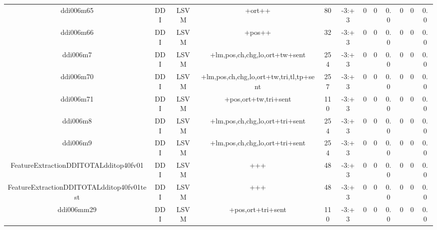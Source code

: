\documentclass[a4paper]{article}
\begin{document}
\begin{landscape}
\begin{center}
\begin{tabular}{ |c|c|c|c|c|c|c|c|c|c|c|c|}
 
 	
 	\small{ ddi006m65 } & \small{ DDI} & \small{  LSVM }  & +ort++  &  80 &  \small{  -3:+3 }  &  0 & 0 & 0.0  &  0 & 0 & 0.0 \\
 	

 
 	
 	\small{ ddi006m66 } & \small{ DDI} & \small{  LSVM }  & +pos++  &  32 &  \small{  -3:+3 }  &  0 & 0 & 0.0  &  0 & 0 & 0.0 \\
 	

 
 	
 	\small{ ddi006m7 } & \small{ DDI} & \small{  LSVM }  & +lm,pos,ch,chg,lo,ort+tw+sent  &  254 &  \small{  -3:+3 }  &  0 & 0 & 0.0  &  0 & 0 & 0.0 \\
 	

 
 	
 	\small{ ddi006m70 } & \small{ DDI} & \small{  LSVM }  & +lm,pos,ch,chg,lo,ort+tw,tri,tl,tp+sent  &  257 &  \small{  -3:+3 }  &  0 & 0 & 0.0  &  0 & 0 & 0.0 \\
 	

 
 	
 	\small{ ddi006m71 } & \small{ DDI} & \small{  LSVM }  & +pos,ort+tw,tri+sent  &  110 &  \small{  -3:+3 }  &  0 & 0 & 0.0  &  0 & 0 & 0.0 \\
 	

 
 	
 	\small{ ddi006m8 } & \small{ DDI} & \small{  LSVM }  & +lm,pos,ch,chg,lo,ort+tri+sent  &  254 &  \small{  -3:+3 }  &  0 & 0 & 0.0  &  0 & 0 & 0.0 \\
 	

 
 	
 	\small{ ddi006m9 } & \small{ DDI} & \small{  LSVM }  & +lm,pos,ch,chg,lo,ort+tri+sent  &  254 &  \small{  -3:+3 }  &  0 & 0 & 0.0  &  0 & 0 & 0.0 \\
 	

 
 	
 	\small{ FeatureExtractionDDITOTALdditop40fv01 } & \small{ DDI} & \small{  LSVM }  & +++  &  48 &  \small{  -3:+3 }  &  0 & 0 & 0.0  &  0 & 0 & 0.0 \\
 	

 
 	
 	\small{ FeatureExtractionDDITOTALdditop40fv01test } & \small{ DDI} & \small{  LSVM }  & +++  &  48 &  \small{  -3:+3 }  &  0 & 0 & 0.0  &  0 & 0 & 0.0 \\
 	

 
 	
 	\small{ ddi006mm29 } & \small{ DDI} & \small{  LSVM }  & +pos,ort+tri+sent  &  110 &  \small{  -3:+3 }  &  0 & 0 & 0.0  &  0 & 0 & 0.0 \\
 	


\end{tabular}
\end{center}
\end{landscape}
\end{document}
